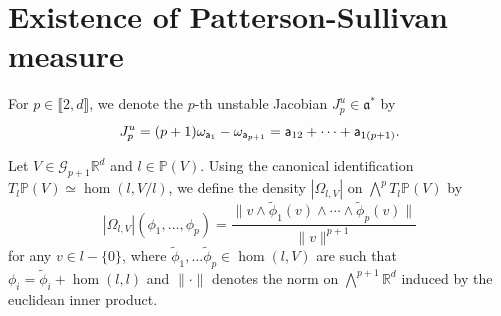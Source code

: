 \documentclass{report}
\begin{document}
\section{Existence of Patterson-Sullivan measure}\label{sec:MeasureExistence}
\begin{definition}
    For $p \in \llbracket 2, d \rrbracket$, we denote the $p$-th unstable Jacobian $J_p^u \in \mathfrak a^*$ by
    \[
    J_p^u = (p+1) \omega_{{\sf a}_1} - \omega_{{\sf a}_{p+1}} = 
    {\sf a}_{12} + \cdots + {\sf a}_{1(p+1)}.
    \]

\end{definition}
\begin{definition}
    Let $V \in \mathcal G_{p+1}{\mathbb R^d}$ and $l \in \mathbb P(V)$.
    Using the canonical identification $T_l \mathbb P(V) \simeq \hom (l, V/l)$, we define the density $|\Omega_{l, V}|$ on $\bigwedge^p T_l \mathbb P(V)$ by
    \[
        |\Omega_{l,V}|(\phi_1, \ldots, \phi_p) = 
        \frac{\| v \wedge \tilde \phi_1(v) \wedge \cdots \wedge \tilde \phi_p (v) \|}{\|v\|^{p+1}}
    \]
    for any $v \in l - \{ 0\}$, where $\tilde \phi_1, \ldots \tilde \phi_p \in \hom(l, V)$ are such that $\phi_i = \tilde \phi_i + \hom(l, l)$ and $\| \cdot \|$ denotes the norm on $\bigwedge^{p+1} \mathbb R^d$ induced by the euclidean inner product.
\end{definition}
\end{document}
